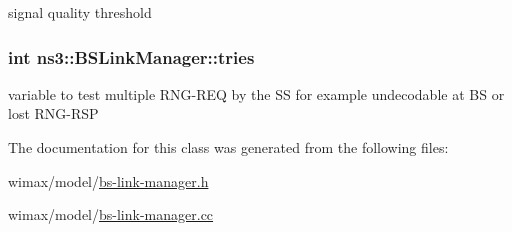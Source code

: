 signal quality threshold 

\subsubsection[{\texorpdfstring{tries}{tries}}]{\setlength{\rightskip}{0pt plus 5cm}int ns3\+::\+B\+S\+Link\+Manager\+::tries\hspace{0.3cm}{\ttfamily [private]}}\hypertarget{classns3_1_1BSLinkManager_a7eeaf72c73cddf69a0a5cb90ab1c1fc1}{}\label{classns3_1_1BSLinkManager_a7eeaf72c73cddf69a0a5cb90ab1c1fc1}


variable to test multiple R\+N\+G-\/\+R\+EQ by the SS for example undecodable at BS or lost R\+N\+G-\/\+R\+SP 



The documentation for this class was generated from the following files\+:\begin{DoxyCompactItemize}
\item 
wimax/model/\hyperlink{bs-link-manager_8h}{bs-\/link-\/manager.\+h}\item 
wimax/model/\hyperlink{bs-link-manager_8cc}{bs-\/link-\/manager.\+cc}\end{DoxyCompactItemize}
